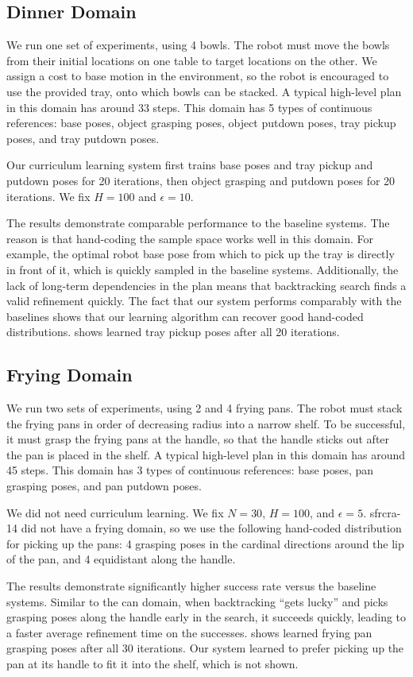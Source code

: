 \subsection{Dinner Domain}
We run one set of experiments, using 4 bowls. The robot must
move the bowls from their initial locations on one table to target
locations on the other. We assign a cost to base motion in the
environment, so the robot is encouraged to use the provided tray, onto
which bowls can be stacked. A typical high-level plan in this domain has around 33 steps.
This domain has 5 types of continuous
references: base poses, object grasping poses, object putdown poses,
tray pickup poses, and tray putdown poses.

Our curriculum learning system first trains base poses and tray pickup
and putdown poses for 20 iterations, then object grasping and putdown
poses for 20 iterations. We fix $H = 100$ and $\epsilon = 10$.

The results demonstrate comparable performance to the baseline
systems. The reason is that hand-coding the sample space works well in
this domain. For example, the optimal robot base pose from which to
pick up the tray is directly in front of it, which is quickly sampled
in the baseline systems. Additionally, the lack of long-term
dependencies in the plan means that backtracking search finds a valid
refinement quickly. The fact that our system performs comparably with
the baselines shows that our learning algorithm can recover good
hand-coded distributions.   shows learned tray
pickup poses after all 20 iterations.

\subsection{Frying Domain}
We run two sets of experiments, using 2 and 4 frying pans. The robot
must stack the frying pans in order of decreasing radius into a narrow
shelf. To be successful, it must grasp the frying pans at the handle,
so that the handle sticks out after the pan is placed in the
shelf. A typical high-level plan in this domain has around 45 steps.
This domain has 3 types of continuous references: base poses,
pan grasping poses, and pan putdown poses.

We did not need curriculum learning. We fix $N = 30$, $H = 100$, and
$\epsilon = 5$. {\sc sfrcra-14} did not have a frying domain, so we
use the following hand-coded distribution for picking up the pans: 4
grasping poses in the cardinal directions around the lip of the pan,
and 4 equidistant along the handle.

The results demonstrate significantly higher success rate versus the
baseline systems. Similar to the can domain, when backtracking ``gets lucky'' and
picks grasping poses along the handle early in the search, it succeeds quickly, leading
to a faster average refinement time on the successes.
 shows learned frying pan grasping poses
after all 30 iterations. Our system learned to prefer picking up the
pan at its handle to fit it into the shelf, which is not shown.







